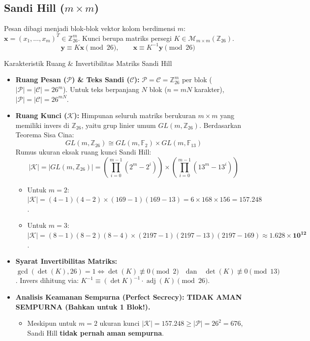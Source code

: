 \documentclass[11pt,a4paper]{article}
\begin{document}
\subsection{Sandi Hill \texorpdfstring{($m \times m$)}{(m x m)}}
Pesan dibagi menjadi blok-blok vektor kolom berdimensi $m$: $\mathbf{x} = (x_1, \dots, x_m)^T \in \mathbb{Z}_{26}^m$. Kunci berupa matriks persegi $K \in \mathcal{M}_{m \times m}(\mathbb{Z}_{26})$.
\[
\mathbf{y} \equiv K \mathbf{x} \pmod{26}, \qquad \mathbf{x} \equiv K^{-1} \mathbf{y} \pmod{26}
\]
\begin{thmbox}{Karakteristik Ruang \& Invertibilitas Matriks Sandi Hill}
\begin{itemize}[leftmargin=*]
    \item \textbf{Ruang Pesan ($\mathcal{P}$) \& Teks Sandi ($\mathcal{C}$):} $\mathcal{P} = \mathcal{C} = \mathbb{Z}_{26}^m$ per blok ($|\mathcal{P}| = |\mathcal{C}| = 26^m$). Untuk teks berpanjang $N$ blok ($n = mN$ karakter), $|\mathcal{P}| = |\mathcal{C}| = 26^{mN}$.
    \item \textbf{Ruang Kunci ($\mathcal{K}$):} Himpunan seluruh matriks berukuran $m \times m$ yang memiliki invers di $\mathbb{Z}_{26}$, yaitu grup linier umum $GL(m, \mathbb{Z}_{26})$. Berdasarkan Teorema Sisa Cina:
    \[
    GL(m, \mathbb{Z}_{26}) \cong GL(m, \mathbb{F}_2) \times GL(m, \mathbb{F}_{13})
    \]
    Rumus ukuran eksak ruang kunci Sandi Hill:
    \[
    |\mathcal{K}| = |GL(m, \mathbb{Z}_{26})| = \left(\prod_{i=0}^{m-1} (2^m - 2^i)\right) \times \left(\prod_{i=0}^{m-1} (13^m - 13^i)\right)
    \]
    \begin{itemize}
        \item Untuk $m = 2$: $|\mathcal{K}| = (4-1)(4-2) \times (169-1)(169-13) = 6 \times 168 \times 156 = \mathbf{157.248}$.
        \item Untuk $m = 3$: $|\mathcal{K}| = (8-1)(8-2)(8-4) \times (2197-1)(2197-13)(2197-169) \approx \mathbf{1.628 \times 10^{12}}$.
    \end{itemize}
    \item \textbf{Syarat Invertibilitas Matriks:} $\gcd(\det(K), 26) = 1 \iff \det(K) \not\equiv 0 \pmod 2 \quad \text{dan} \quad \det(K) \not\equiv 0 \pmod{13}$.
    Invers dihitung via: $K^{-1} \equiv (\det K)^{-1} \cdot \operatorname{adj}(K) \pmod{26}$.
    \item \textbf{Analisis Keamanan Sempurna (Perfect Secrecy): TIDAK AMAN SEMPURNA (Bahkan untuk 1 Blok!).}
    \begin{itemize}
        \item Meskipun untuk $m = 2$ ukuran kunci $|\mathcal{K}| = 157.248 \ge |\mathcal{P}| = 26^2 = 676$, Sandi Hill \textbf{tidak pernah aman sempurna}.

\end{itemize}
\end{itemize}
\end{thmbox}
\end{document}
